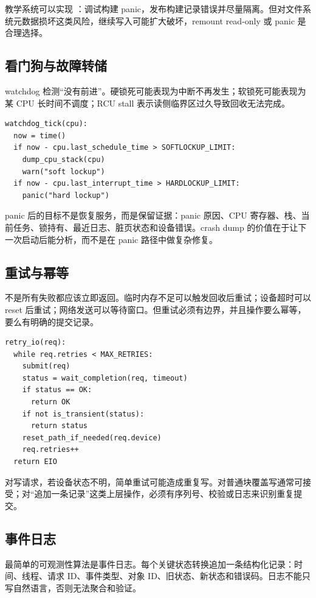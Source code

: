 教学系统可以实现 ：调试构建 panic，发布构建记录错误并尽量隔离。但对文件系统元数据损坏这类风险，继续写入可能扩大破坏，remount read-only 或 panic 是合理选择。

\subsection{看门狗与故障转储}

watchdog 检测“没有前进”。硬锁死可能表现为中断不再发生；软锁死可能表现为某 CPU 长时间不调度；RCU stall 表示读侧临界区过久导致回收无法完成。

\begin{lstlisting}
watchdog_tick(cpu):
  now = time()
  if now - cpu.last_schedule_time > SOFTLOCKUP_LIMIT:
    dump_cpu_stack(cpu)
    warn("soft lockup")
  if now - cpu.last_interrupt_time > HARDLOCKUP_LIMIT:
    panic("hard lockup")
\end{lstlisting}

panic 后的目标不是恢复服务，而是保留证据：panic 原因、CPU 寄存器、栈、当前任务、锁持有、最近日志、脏页状态和设备错误。crash dump 的价值在于让下一次启动后能分析，而不是在 panic 路径中做复杂修复。

\subsection{重试与幂等}

不是所有失败都应该立即返回。临时内存不足可以触发回收后重试；设备超时可以 reset 后重试；网络发送可以等待窗口。但重试必须有边界，并且操作要么幂等，要么有明确的提交记录。

\begin{lstlisting}
retry_io(req):
  while req.retries < MAX_RETRIES:
    submit(req)
    status = wait_completion(req, timeout)
    if status == OK:
      return OK
    if not is_transient(status):
      return status
    reset_path_if_needed(req.device)
    req.retries++
  return EIO
\end{lstlisting}

对写请求，若设备状态不明，简单重试可能造成重复写。对普通块覆盖写通常可接受；对“追加一条记录”这类上层操作，必须有序列号、校验或日志来识别重复提交。

\subsection{事件日志}

最简单的可观测性算法是事件日志。每个关键状态转换追加一条结构化记录：时间、线程、请求 ID、事件类型、对象 ID、旧状态、新状态和错误码。日志不能只写自然语言，否则无法聚合和验证。

